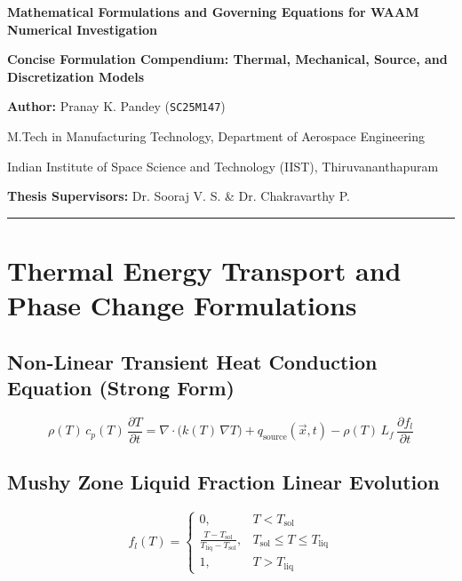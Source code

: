 \documentclass[10pt,a4paper]{article}
\begin{document}
\begin{center}
    {\LARGE\bfseries Mathematical Formulations and Governing Equations for WAAM Numerical Investigation\par}
    \vspace{0.35em}
    {\large\textbf{Concise Formulation Compendium: Thermal, Mechanical, Source, and Discretization Models}\par}
    \vspace{0.35em}
    {\normalsize\textbf{Author:} Pranay K. Pandey (\texttt{SC25M147})\par}
    {\small M.Tech in Manufacturing Technology, Department of Aerospace Engineering\par}
    {\small Indian Institute of Space Science and Technology (IIST), Thiruvananthapuram\par}
    \vspace{0.15em}
    {\small\textbf{Thesis Supervisors:} Dr. Sooraj V. S. \& Dr. Chakravarthy P.\par}
\end{center}

\vspace{0.15em}
\hrule
\vspace{0.6em}

\section{Thermal Energy Transport and Phase Change Formulations}

\subsection*{Non-Linear Transient Heat Conduction Equation (Strong Form)}
\[
\rho(T)\,c_p(T)\,\frac{\partial T}{\partial t} = \nabla \cdot \bigl(k(T)\,\nabla T\bigr) + q_{\mathrm{source}}(\vec{x}, t) - \rho(T)\,L_f\,\frac{\partial f_l}{\partial t}
\]

\subsection*{Mushy Zone Liquid Fraction Linear Evolution}
\[
f_l(T) = \begin{cases}
0, & T < T_{\mathrm{sol}} \\
\displaystyle\frac{T - T_{\mathrm{sol}}}{T_{\mathrm{liq}} - T_{\mathrm{sol}}}, & T_{\mathrm{sol}} \le T \le T_{\mathrm{liq}} \\
1, & T > T_{\mathrm{liq}}
\end{cases}
\]
\end{document}
